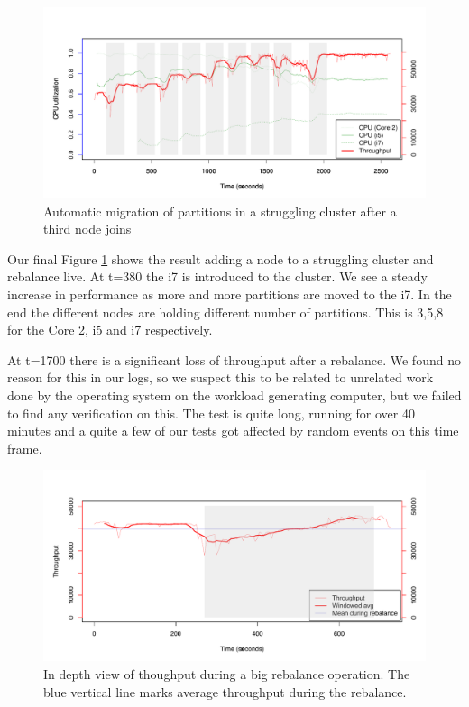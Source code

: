 \clearpage
\begin{figure}[h]
    \centering
    \includegraphics[width=1.0\textwidth]{results/adaptive3node}
    \caption{Automatic migration of partitions in a struggling cluster after a third node joins}
    \label{fig:adapt_3node}
\end{figure}
Our final Figure \ref{fig:adapt_3node} shows the result adding a node to a struggling cluster and rebalance live. At t=380 the i7 is introduced to the cluster. We see a steady increase in performance as more and more partitions are moved to the i7. In the end the different nodes are holding different number of partitions. This is 3,5,8 for the Core 2, i5 and i7 respectively. 

At t=1700 there is a significant loss of throughput after a rebalance. We found no reason for this in our logs, so we suspect this to be related to unrelated work done by the operating system on the workload generating computer, but we failed to find any verification on this. The test is quite long, running for over 40 minutes and a quite a few of our tests got affected by random events on this time frame.

\clearpage
\begin{figure}[h]
    \centering
    \includegraphics[width=1.0\textwidth]{results/throughput/adaptive/zookeeper/auto_3nodes_muchdata_wow}
    \caption{In depth view of thoughput during a big rebalance operation. The blue vertical line marks average throughput during the rebalance.}
    \label{fig:adapt_big_rebalance}
\end{figure}

